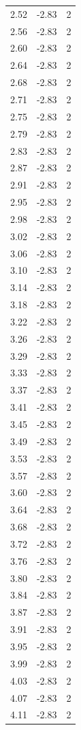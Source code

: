 \begin{longtable}{lrr}
  2.52 & -2.83 & 2 \\
  2.56 & -2.83 & 2 \\
  2.60 & -2.83 & 2 \\
  2.64 & -2.83 & 2 \\
  2.68 & -2.83 & 2 \\
  2.71 & -2.83 & 2 \\
  2.75 & -2.83 & 2 \\
  2.79 & -2.83 & 2 \\
  2.83 & -2.83 & 2 \\
  2.87 & -2.83 & 2 \\
  2.91 & -2.83 & 2 \\
  2.95 & -2.83 & 2 \\
  2.98 & -2.83 & 2 \\
  3.02 & -2.83 & 2 \\
  3.06 & -2.83 & 2 \\
  3.10 & -2.83 & 2 \\
  3.14 & -2.83 & 2 \\
  3.18 & -2.83 & 2 \\
  3.22 & -2.83 & 2 \\
  3.26 & -2.83 & 2 \\
  3.29 & -2.83 & 2 \\
  3.33 & -2.83 & 2 \\
  3.37 & -2.83 & 2 \\
  3.41 & -2.83 & 2 \\
  3.45 & -2.83 & 2 \\
  3.49 & -2.83 & 2 \\
  3.53 & -2.83 & 2 \\
  3.57 & -2.83 & 2 \\
  3.60 & -2.83 & 2 \\
  3.64 & -2.83 & 2 \\
  3.68 & -2.83 & 2 \\
  3.72 & -2.83 & 2 \\
  3.76 & -2.83 & 2 \\
  3.80 & -2.83 & 2 \\
  3.84 & -2.83 & 2 \\
  3.87 & -2.83 & 2 \\
  3.91 & -2.83 & 2 \\
  3.95 & -2.83 & 2 \\
  3.99 & -2.83 & 2 \\
  4.03 & -2.83 & 2 \\
  4.07 & -2.83 & 2 \\
  4.11 & -2.83 & 2 \\

\end{longtable}
